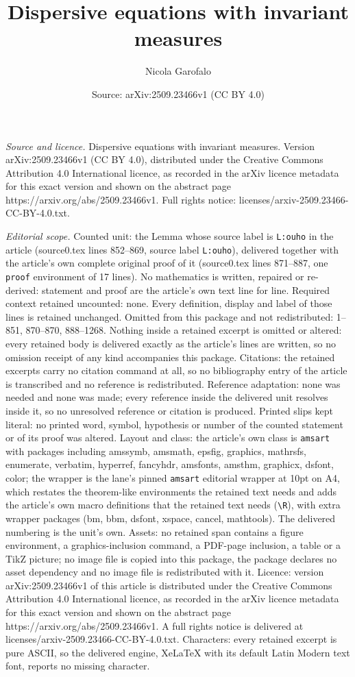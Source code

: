 \documentclass[10pt,a4paper]{amsart}
\title[Dispersive equations with invariant measures]{Dispersive equations with invariant measures}
\author{Nicola Garofalo}
\date{Source: arXiv:2509.23466v1 (CC BY 4.0)}
\begin{document}
\maketitle

\noindent\emph{Source and licence.} Dispersive equations with invariant measures. Version arXiv:2509.23466v1 (CC BY 4.0), distributed under the Creative Commons Attribution 4.0 International licence, as recorded in the arXiv licence metadata for this exact version and shown on the abstract page https://arxiv.org/abs/2509.23466v1. Full rights notice: licenses/arxiv-2509.23466-CC-BY-4.0.txt.\par\smallskip

\noindent\textit{Editorial scope.} Counted unit: the Lemma whose source label is \texttt{L:ouho} in the article (source0.tex lines 852--869, source label \texttt{L:ouho}), delivered together with the article's own complete original proof of it (source0.tex lines 871--887, one \texttt{proof} environment of 17 lines). No mathematics is written, repaired or re-derived: statement and proof are the article's own text line for line. Required context retained uncounted: none. Every definition, display and label of those lines is retained unchanged. Omitted from this package and not redistributed: 1--851, 870--870, 888--1268. Nothing inside a retained excerpt is omitted or altered: every retained body is delivered exactly as the article's lines are written, so no omission receipt of any kind accompanies this package. Citations: the retained excerpts carry no citation command at all, so no bibliography entry of the article is transcribed and no reference is redistributed. Reference adaptation: none was needed and none was made; every reference inside the delivered unit resolves inside it, so no unresolved reference or citation is produced. Printed slips kept literal: no printed word, symbol, hypothesis or number of the counted statement or of its proof was altered. Layout and class: the article's own class is \texttt{amsart} with packages including amssymb, amsmath, epsfig, graphics, mathrsfs, enumerate, verbatim, hyperref, fancyhdr, amsfonts, amsthm, graphicx, dsfont, color; the wrapper is the lane's pinned \texttt{amsart} editorial wrapper at 10pt on A4, which restates the theorem-like environments the retained text needs and adds the article's own macro definitions that the retained text needs (\texttt{\textbackslash R}), with extra wrapper packages (bm, bbm, dsfont, xspace, cancel, mathtools). The delivered numbering is the unit's own. Assets: no retained span contains a figure environment, a graphics-inclusion command, a PDF-page inclusion, a table or a TikZ picture; no image file is copied into this package, the package declares no asset dependency and no image file is redistributed with it. Licence: version arXiv:2509.23466v1 of this article is distributed under the Creative Commons Attribution 4.0 International licence, as recorded in the arXiv licence metadata for this exact version and shown on the abstract page https://arxiv.org/abs/2509.23466v1. A full rights notice is delivered at licenses/arxiv-2509.23466-CC-BY-4.0.txt. Characters: every retained excerpt is pure ASCII, so the delivered engine, XeLaTeX with its default Latin Modern text font, reports no missing character.
\end{document}
